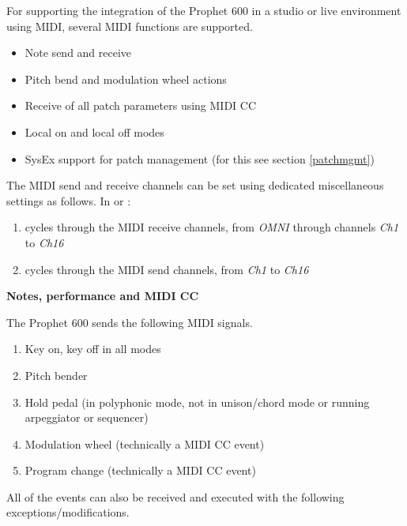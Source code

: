 For supporting the integration of the Prophet 600 in a studio or live environment using MIDI, several MIDI functions are supported.

\begin{itemize}
  \item Note send and receive
  \item Pitch bend and modulation wheel actions
  \item Receive of all patch parameters using MIDI CC
  \item Local on and local off modes
  \item SysEx support for patch management (for this see section \ref{patchmgmt})
\end{itemize}

The MIDI send and receive channels can be set using dedicated miscellaneous settings as follows. In \shiftmode or \shiftlock:

\begin{enumerate}
  \setlength\itemsep{0cm}
  \item {} cycles through the MIDI receive channels, from \textit{OMNI} through channels \textit{Ch1} to \textit{Ch16}
  \item {}  cycles through the MIDI send channels, from \textit{Ch1} to \textit{Ch16}
\end{enumerate}

\textbf{Notes, performance and MIDI CC}

The Prophet 600 sends the following MIDI signals. 

\begin{enumerate}
  \setlength\itemsep{0cm}
  \item Key on, key off in all modes
  \item Pitch bender
  \item Hold pedal (in polyphonic mode, not in unison/chord mode or running arpeggiator or sequencer)
  \item Modulation wheel (technically a MIDI CC event)
  \item Program change (technically a MIDI CC event)
\end{enumerate}

All of the events can also be received and executed with the following exceptions/modifications.

